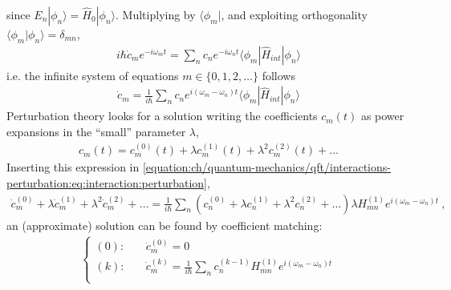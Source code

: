\documentclass[letterpaper,10pt,english]{jupyterBook}
\begin{document}
\sphinxAtStartPar
since \(E_n| \phi_n \rangle = \hat{H}_0 | \phi_n \rangle\). Multiplying by \(\langle\phi_m|\), and exploiting orthogonality \(\langle \phi_m | \phi_n \rangle = \delta_{mn}\),
\begin{equation*}
\begin{split}
i\hbar\dot c_me^{-i\omega_mt}=\sum_nc_ne^{-i\omega_nt}\langle\phi_m|\hat H_{int}|\phi_n\rangle
\end{split}
\end{equation*}
\sphinxAtStartPar
i.e. the infinite system of equations \sphinxhyphen{} \(m \in \{0,1,2,\dots\}\) \sphinxhyphen{} follows
\begin{equation}\label{equation:ch/quantum-mechanics/qft/interactions-perturbation:eq:interaction:perturbation}
\begin{split}
\dot c_m=\frac1{i\hbar}\sum_nc_ne^{i(\omega_m-\omega_n)t}\langle\phi_m|\hat H_{int}|\phi_n\rangle
\end{split}
\end{equation}
\sphinxAtStartPar
Perturbation theory looks for a solution writing the coefficients \(c_m(t)\) as power expansions in the “small” parameter \(\lambda\),
\begin{equation*}
\begin{split}
c_m(t)=c_m^{(0)}(t)+\lambda c_m^{(1)}(t)+\lambda^2c_m^{(2)}(t)+\dots
\end{split}
\end{equation*}
\sphinxAtStartPar
Inserting this expression in \eqref{equation:ch/quantum-mechanics/qft/interactions-perturbation:eq:interaction:perturbation},
\begin{equation*}
\begin{split}\dot c_m^{(0)}+\lambda\dot c_m^{(1)}+\lambda^2\dot c_m^{(2)}+\dots=\frac1{i\hbar}\sum_n\left(c_n^{(0)}+\lambda c_n^{(1)}+\lambda^2c_n^{(2)}+\dots\right) \lambda H^{(1)}_{mn}e^{i(\omega_m-\omega_n)t} \ ,\end{split}
\end{equation*}
\sphinxAtStartPar
an (approximate) solution can be found by coefficient matching:
\begin{equation*}
\begin{split}\left\{ \begin{aligned}
(0): & \quad \dot{c}_m^{(0)} = 0 \\
(k): & \quad \dot{c}_m^{(k)} = \frac{1}{i\hbar} \sum_n c_n^{(k-1)} H^{(1)}_{mn} e^{i ( \omega_m - \omega_n ) t} \\
\end{aligned} \right.\end{split}
\end{equation*}
\end{document}
